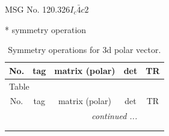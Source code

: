 \documentclass[fleqn,8pt]{jsarticle}
\begin{document}
\setcounter{MaxMatrixCols}{32}

\renewcommand{\tablename}{Table~}
\renewcommand{\figurename}{Figure~}
\begin{center}
\LARGE
MSG No. 120.326\quad$I_{c}\bar{4}c2$
\end{center}
* symmetry operation
\renewcommand{\arraystretch}{1.3}
\begin{longtable}{ccccc}
\caption{Symmetry operations for 3d polar vector.}
 \\
 \hline \hline
No. & tag & matrix (polar) & det & TR \\ \hline \endfirsthead

\multicolumn{4}{l}{\tablename\ \thetable{}} \\
 \hline \hline
No. & tag & matrix (polar) & det & TR \\ \hline \endhead

 \hline \hline
\multicolumn{4}{r}{\footnotesize\it continued ...} \\ \endfoot

 \hline \hline
\multicolumn{4}{r}{} \\ \endlastfoot


\end{longtable}
\end{document}
